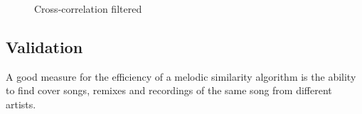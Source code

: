\begin{figure}[htbp]
	\centering
	\caption{Cross-correlation filtered}
	\label{fig:crosscorr3}
\end{figure}
\FloatBarrier



\subsection{Validation}
A good measure for the efficiency of a melodic similarity algorithm is the ability to find cover songs, remixes and recordings of the same song from different artists. 

